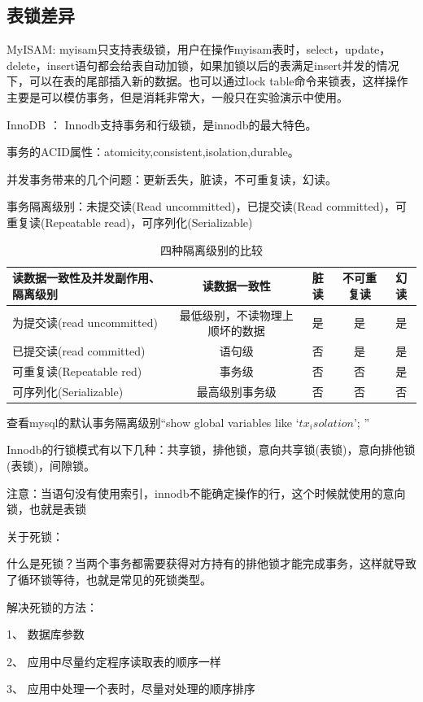 \documentclass[UTF8]{ctexart}
\begin{document}
\subsection{表锁差异}
MyISAM:
myisam只支持表级锁，用户在操作myisam表时，select，update，delete，insert语句都会给表自动加锁，如果加锁以后的表满足insert并发的情况下，可以在表的尾部插入新的数据。也可以通过lock table命令来锁表，这样操作主要是可以模仿事务，但是消耗非常大，一般只在实验演示中使用。

InnoDB ：
Innodb支持事务和行级锁，是innodb的最大特色。

事务的ACID属性：atomicity,consistent,isolation,durable。

并发事务带来的几个问题：更新丢失，脏读，不可重复读，幻读。

事务隔离级别：未提交读(Read uncommitted)，已提交读(Read committed)，可重复读(Repeatable read)，可序列化(Serializable)
\begin{table}[]
    \caption{四种隔离级别的比较}
    \vspace{20pt}
    \centering
    \begin{tabular}{|l|c|c|c|c|}
        \hline
        读数据一致性及并发副作用、隔离级别&读数据一致性&脏读&不可重复读&幻读\\
        \hline
		为提交读(read uncommitted)&最低级别，不读物理上顺坏的数据&是&是&是\\
		已提交读(read committed)	&语句级&否&是&是\\
		可重复读(Repeatable red)	&事务级&否&否&是\\
		可序列化(Serializable)	&最高级别事务级&否&否&否\\
        \hline       
    \end{tabular}
    \label{bs02}
\end{table}
查看mysql的默认事务隔离级别“show global variables like $‘tx_isolation’$; ”

Innodb的行锁模式有以下几种：共享锁，排他锁，意向共享锁(表锁)，意向排他锁(表锁)，间隙锁。

注意：当语句没有使用索引，innodb不能确定操作的行，这个时候就使用的意向锁，也就是表锁

关于死锁：

什么是死锁？当两个事务都需要获得对方持有的排他锁才能完成事务，这样就导致了循环锁等待，也就是常见的死锁类型。

解决死锁的方法：

1、  数据库参数

2、  应用中尽量约定程序读取表的顺序一样

3、  应用中处理一个表时，尽量对处理的顺序排序
\end{document}

